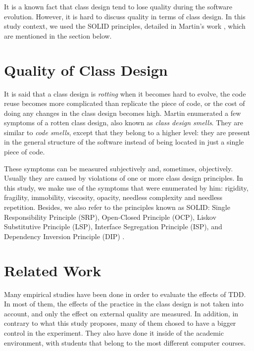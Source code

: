\documentclass[conference]{IEEEtran}
\begin{document}
It is a known fact that class design tend to lose quality during the software evolution.
However, it is hard to discuss quality in terms of class design. In this study context,
we used the SOLID principles, detailed in Martin's work \cite{bob-martin}, which are
mentioned in the section below.

\section{Quality of Class Design}

It is said that a class design is \textit{rotting} when it becomes hard
to evolve, the code reuse becomes more complicated than replicate the piece
of code, or the cost of doing any changes in the class design becomes high.
Martin \cite{bob-martin} enumerated a few symptoms of a rotten class design,
also known as \textit{class design smells}. They are similar to \textit{code smells},
except that they belong to a higher level: they are present in the general structure
of the software instead of being located in just a single piece of code.

These symptoms can be measured subjectively and, sometimes, objectively. Usually
they are caused by violations of one or more class design principles.
In this study, we make use of the symptoms that were enumerated by him: 
rigidity, fragility, immobility, viscosity, opacity, needless complexity and
needless repetition. Besides, we also refer to the principles known as SOLID:
Single Responsibility Principle (SRP), Open-Closed Principle (OCP),
Liskov Substitutive Principle (LSP), Interface Segregation Principle (ISP), and
Dependency Inversion Principle (DIP) \cite{bob-martin}.

\section{Related Work}
\label{cap:trabalhos-relacionados}

Many empirical studies have been done in order to evaluate the effects of TDD.
In most of them, the effects of the practice in the class design is not taken
into account, and only the effect on external quality are measured. In addition,
in contrary to what this study proposes, many of them chosed
to have a bigger control in the experiment. They also have done it inside of the academic
environment, with students that belong to the most different computer courses.
\end{document}
